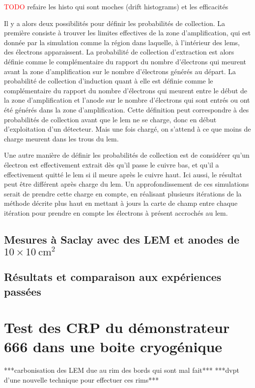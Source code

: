            \textcolor{red}{TODO} refaire les histo qui sont moches (drift histograms) et les efficacités
            
            Il y a alors deux possibilités pour définir les probabilités de collection. La première consiste à trouver les limites effectives de la zone d'amplification, qui est donnée par la simulation comme la région dans laquelle, à l'intérieur des \glspl{lem}, des électrons apparaissent. La probabilité de collection d'extraction est alors définie comme le complémentaire du rapport du nombre d'électrons qui meurent avant la zone d'amplification sur le nombre d'électrons générés au départ. La probabilité de collection d'induction quant à elle est définie comme le complémentaire du rapport du nombre d'électrons qui meurent entre le début de la zone d'amplification et l'anode sur le nombre d'électrons qui sont entrés ou ont été générés dans la zone d'amplification. Cette définition peut correspondre à des probabilités de collection avant que le \gls{lem} ne se charge, donc en début d'exploitation d'un détecteur. Mais une fois chargé, on s'attend à ce que moins de charge meurent dans les trous du \gls{lem}.
            
            Une autre manière de définir les probabilités de collection est de considérer qu'un électron est effectivement extrait dès qu'il passe le cuivre bas, et qu'il a effectivement quitté le \gls{lem} si il meure après le cuivre haut. Ici aussi, le résultat peut être différent après charge du \gls{lem}. Un approfondissement de ces simulations serait de prendre cette charge en compte, en réalisant plusieurs itérations de la méthode décrite plus haut en mettant à jours la carte de champ entre chaque itération pour prendre en compte les électrons à présent accrochés au \gls{lem}.
            
            
            
        \subsection{Mesures à Saclay avec des LEM et anodes de \texorpdfstring{$10\times\SI{10}{\cm\squared}$}{10x10cm2} }
        
        \subsection{Résultats et comparaison aux expériences passées}
        
    \section{Test des CRP du démonstrateur 666 dans une boite cryogénique}
        ***carbonisation des LEM due au rim des bords qui sont mal fait***
        ***dvpt d'une nouvelle technique pour effectuer ces rims***
        
